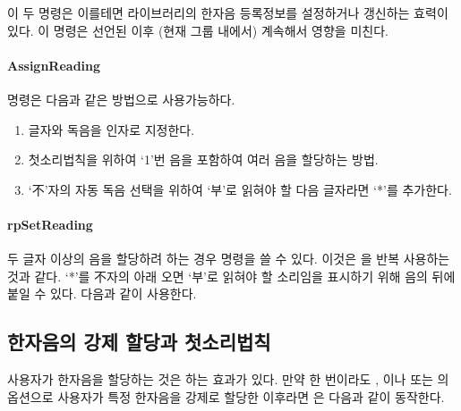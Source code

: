 \documentclass[a4paper,12pt,itemph,footnote]{oblivoir}
\begin{document}
이 두 명령은 이를테면 라이브러리의 한자음 등록정보를 설정하거나 갱신하는 효력이 있다. 
이 명령은 선언된 이후 (현재 그룹 내에서) 계속해서 영향을 미친다.

\paragraph{AssignReading}
 명령은 다음과 같은 방법으로 사용가능하다.
\begin{enumerate}[(1)] \firmlist
\item 글자와 독음을 인자로 지정한다.
\begin{myexam}[]
 
\end{myexam}
\item 첫소리법칙을 위하여 `1'번 음을 포함하여 여러 음을 할당하는 방법.
\begin{myexam}[]
  
\end{myexam}
\item `不'자의 자동 독음 선택을 위하여 `부'로 읽혀야 할 다음 글자라면 `*'를 추가한다.
\begin{myexam}[]
 
\end{myexam}
\end{enumerate}

\paragraph{rpSetReading}
두 글자 이상의 음을 할당하려 하는 경우  명령을 쓸 수 있다.
이것은 을 반복 사용하는 것과 같다. `*'를
不자의 아래 오면 `부'로 읽혀야 할 소리임을 표시하기 위해 음의 뒤에 붙일 수 있다.
다음과 같이 사용한다.
\begin{myexam}[]
   
\end{myexam}

\subsection{한자음의 강제 할당과 첫소리법칙}

사용자가 한자음을 할당하는 것은 하는 효과가 있다.
만약 한 번이라도 , 이나
 또는 의 옵션으로 
사용자가 특정 한자음을 강제로 할당한 이후라면 은
다음과 같이 동작한다.
\end{document}
